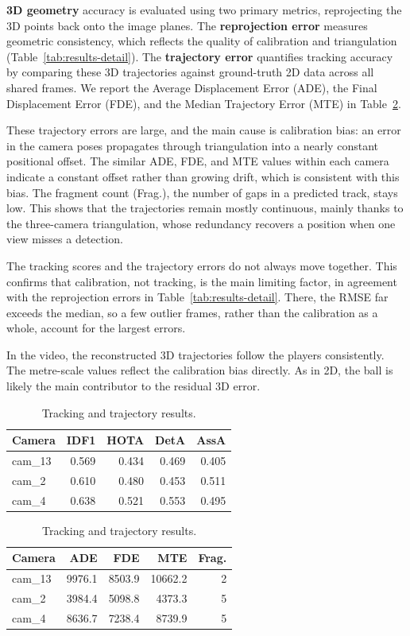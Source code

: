 \textbf{3D geometry} accuracy is evaluated using two primary metrics, reprojecting the 3D points back onto the image planes.
The \textbf{reprojection error} measures geometric consistency, which reflects the quality of calibration and triangulation (Table~\ref{tab:results-detail}).
The \textbf{trajectory error} quantifies tracking accuracy by comparing these 3D trajectories against ground-truth 2D data across all shared frames.
We report the Average Displacement Error (ADE), the Final Displacement Error (FDE), and the Median Trajectory Error (MTE) in Table~\ref{tab:results}.

These trajectory errors are large, and the main cause is calibration bias: an error in the camera poses propagates through triangulation into a nearly constant positional offset.
The similar ADE, FDE, and MTE values within each camera indicate a constant offset rather than growing drift, which is consistent with this bias.
The fragment count (Frag.), the number of gaps in a predicted track, stays low.
This shows that the trajectories remain mostly continuous, mainly thanks to the three-camera triangulation, whose redundancy recovers a position when one view misses a detection.

The tracking scores and the trajectory errors do not always move together.
This confirms that calibration, not tracking, is the main limiting factor, in agreement with the reprojection errors in Table~\ref{tab:results-detail}.
There, the RMSE far exceeds the median, so a few outlier frames, rather than the calibration as a whole, account for the largest errors.

In the video, the reconstructed 3D trajectories follow the players consistently.
The metre-scale values reflect the calibration bias directly.
As in 2D, the ball is likely the main contributor to the residual 3D error.

\begin{table}[htbp]
\centering
\caption{Tracking and trajectory results.}
\label{tab:results}
\small
\begin{minipage}[t]{0.49\textwidth}
\centering
\begin{tabular}{lrrrr}
\toprule
Camera & IDF1 & HOTA & DetA & AssA \\
\midrule
cam\_13 & 0.569 & 0.434 & 0.469 & 0.405 \\
cam\_2  & 0.610 & 0.480 & 0.453 & 0.511 \\
cam\_4  & 0.638 & 0.521 & 0.553 & 0.495 \\
\bottomrule
\end{tabular}
\end{minipage}
\hfill
\begin{minipage}[t]{0.49\textwidth}
\centering
\begin{tabular}{lrrrr}
\toprule
Camera & ADE & FDE & MTE & Frag. \\
\midrule
cam\_13 &  9976.1 &  8503.9 & 10662.2 & 2 \\
cam\_2  &  3984.4 &  5098.8 &  4373.3 & 5 \\
cam\_4  &  8636.7 &  7238.4 &  8739.9 & 5 \\
\bottomrule
\end{tabular}
\end{minipage}
\end{table}

